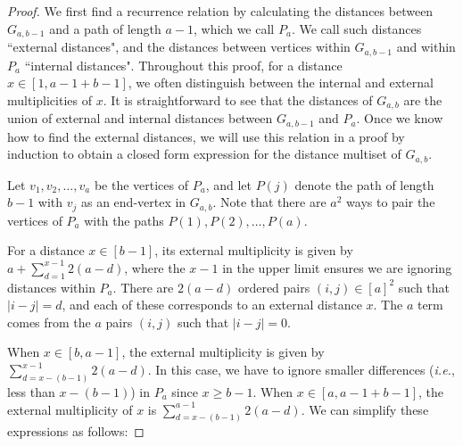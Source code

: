 \documentclass[12]{article}
\theoremstyle{definition}
\begin{document}
\begin{proof}
	
	
	
	
	
	We first find a recurrence relation by calculating the distances between $G_{a,b-1}$ and a path of length $a-1$, which we call $P_a$.  We call such distances ``external distances", and the distances between vertices within $G_{a,b-1}$ and within $P_{a}$ ``internal distances".  Throughout this proof, for a distance $x \in [1, a-1+b-1]$, we often distinguish between the internal and external multiplicities of $x$.  It is straightforward to see that the distances of $G_{a,b}$ are the union of external and internal distances between $G_{a,b-1}$ and $P_a$.  Once we know how to find the external distances, we will use this relation in a proof by induction to obtain a closed form expression for the distance multiset of $G_{a,b}$.  
	
	Let $v_1, v_2, \ldots, v_a$ be the vertices of $P_a$, and let $P(j)$ denote the path of length $b-1$ with $v_j$ as an end-vertex in $G_{a,b}$.  Note that there are $a^2$ ways to pair the vertices of $P_a$ with the paths $P(1), P(2), \ldots, P(a)$.  
	
	For a distance $x \in [b-1]$, its external multiplicity is given by $a + \sum_{d=1}^{x-1}2(a-d)$, where the $x-1$ in the upper limit ensures we are ignoring distances within $P_a$.  There are $2(a-d)$ ordered pairs $(i,j) \in [a]^2$ such that $|i-j| = d$, and each of these corresponds to an external distance $x$.  The $a$ term comes from the $a$ pairs $(i,j)$ such that $|i-j| = 0$.  
	
	When $x \in [b,a-1]$, the external multiplicity is given by $\sum_{d=x-(b-1)}^{x-1}2(a-d)$.  In this case, we have to ignore smaller differences (\textit{i.e.}, less than $x-(b-1)$) in $P_a$ since $x \geq b-1$.  When $x \in [a,a-1+b-1]$, the external multiplicity of $x$ is $\sum_{d=x-(b-1)}^{a-1}2(a-d)$.  We can simplify these expressions as follows:
	

\end{proof}
\end{document}
